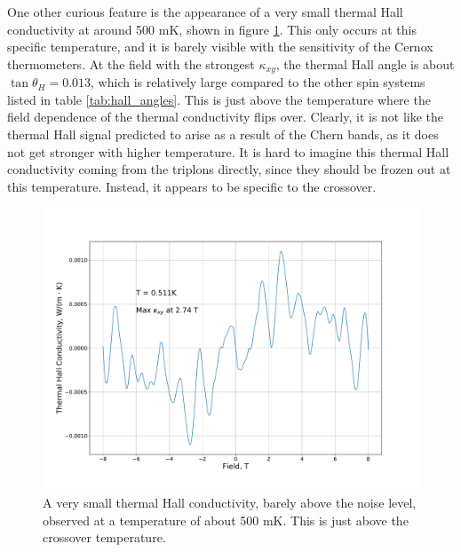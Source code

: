 \documentclass{thesis-umich}
\begin{document}
One other curious feature is the appearance of a very small thermal Hall conductivity at around 500 mK, shown in figure \ref{fig:SCBO_small_thall}. This only occurs at this specific temperature, and it is barely visible with the sensitivity of the Cernox thermometers. At the field with the strongest $\kappa_{xy}$, the thermal Hall angle is about $\tan \theta_H = 0.013$, which is relatively large compared to the other spin systems listed in table \ref{tab:hall_angles}. This is just above the temperature where the field dependence of the thermal conductivity flips over. Clearly, it is not like the thermal Hall signal predicted to arise as a result of the Chern bands, as it does not get stronger with higher temperature. It is hard to imagine this thermal Hall conductivity coming from the triplons directly, since they should be frozen out at this temperature. Instead, it appears to be specific to the crossover. 

\begin{figure}
	\centering
	\caption[Small Thermal Hall Conductivity in SCBO]{A very small thermal Hall conductivity, barely above the noise level, observed at a temperature of about 500 mK. This is just above the crossover temperature.}
	\label{fig:SCBO_small_thall}
	\includegraphics[width=\columnwidth]{figures/SCBO_kappa_xy_vs_B.pdf}
\end{figure}
\end{document}
